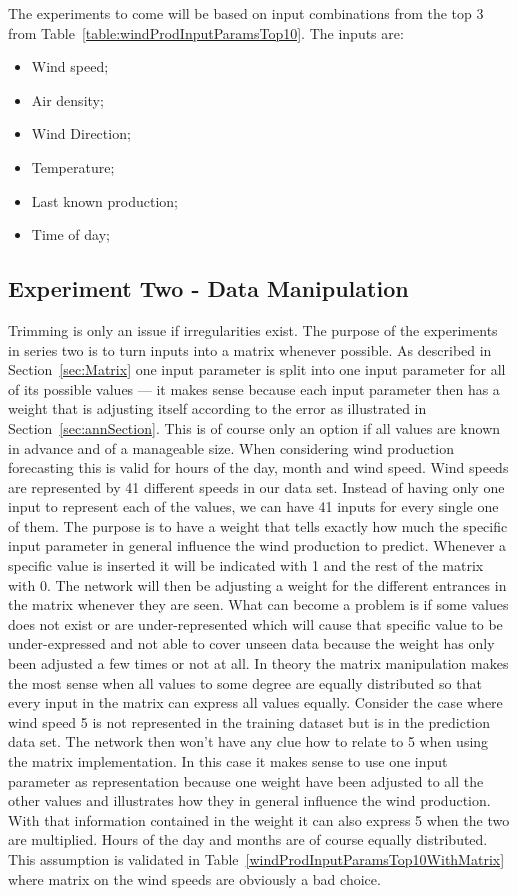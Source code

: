 The experiments to come will be based on input combinations from the top 3 from Table~\ref{table:windProdInputParamsTop10}. The inputs are:
\begin{itemize}
\item Wind speed;
\item Air density;
\item Wind Direction;
\item Temperature;
\item Last known production;
\item Time of day;
\end{itemize}

\subsection{Experiment Two - Data Manipulation}
Trimming is only an issue if irregularities exist. The purpose of the experiments in series two is to turn inputs into a matrix whenever possible. As described in Section~\ref{sec:Matrix} one input parameter is split into one input parameter for all of its possible values --- it makes sense because each input parameter then has a weight that is adjusting itself according to the error as illustrated in Section~\ref{sec:annSection}. This is of course only an option if all values are known in advance and of a manageable size. When considering wind production forecasting this is valid for hours of the day, month and wind speed. Wind speeds are represented  by 41 different speeds in our data set. Instead of having only one input to represent each of the values, we can have 41 inputs for every single one of them. The purpose is to have a weight that tells exactly how much the specific input parameter in general influence the wind production to predict. Whenever a specific value is inserted it will be indicated with 1 and the rest of the matrix with 0. The network will then be adjusting a weight for the different entrances in the matrix whenever they are seen. What can become a problem is if some values does not exist or are under-represented which will cause that specific value to be under-expressed and not able to cover unseen data because the weight has only been adjusted a few times or not at all. In theory the matrix manipulation makes the most sense when all values to some degree are equally distributed so that every input in the matrix can express all values equally. Consider the case where wind speed 5 is not represented in the training dataset but is in the prediction data set. The network then won't have any clue how to relate to 5 when using the matrix implementation. In this case it makes sense to use one input parameter as representation because one weight have been adjusted to all the other values and illustrates how they in general influence the wind production. With that information contained in the weight it can also express 5 when the two are multiplied. Hours of the day and months are of course equally distributed. This assumption is validated in Table~\ref{windProdInputParamsTop10WithMatrix} where matrix on the wind speeds are obviously a bad choice. 

